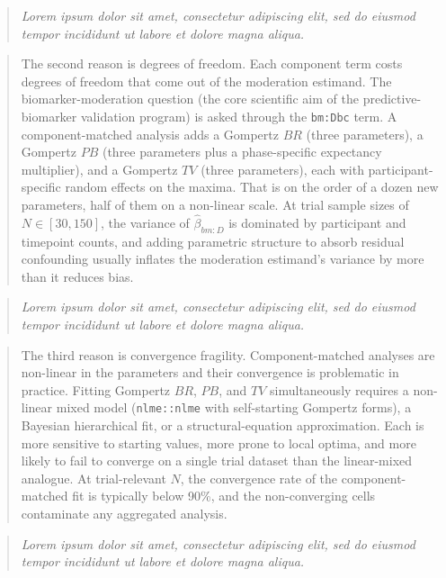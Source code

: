 \documentclass[
  11pt,
]{article}
\newenvironment{rgt}{%
  \begin{quote}\small\itshape\color[RGB]{20,60,160}}{%
  \end{quote}}
\newenvironment{orig}{%
  \begin{quote}\normalsize\color[gray]{0.55}}{%
  \end{quote}}
\begin{document}
\begin{rgt}
Lorem ipsum dolor sit amet, consectetur adipiscing elit, sed do eiusmod tempor incididunt ut labore et dolore magna aliqua.

\end{rgt}

\begin{orig}
The second reason is degrees of freedom. Each component term
costs degrees of freedom that come out of the moderation
estimand. The biomarker-moderation question (the core scientific
aim of the predictive-biomarker validation program) is asked
through the \texttt{bm:Dbc} term. A component-matched analysis
adds a Gompertz \(BR\) (three parameters), a Gompertz \(PB\) (three
parameters plus a phase-specific expectancy multiplier), and a
Gompertz \(TV\) (three parameters), each with
participant-specific random effects on the maxima. That is on
the order of a dozen new parameters, half of them on a
non-linear scale. At trial sample sizes of \(N \in [30, 150]\),
the variance of \(\hat{\beta}_{bm:D}\) is dominated by participant
and timepoint counts, and adding parametric structure to absorb
residual confounding usually inflates the moderation estimand's
variance by more than it reduces bias.

\end{orig}

\begin{rgt}
Lorem ipsum dolor sit amet, consectetur adipiscing elit, sed do eiusmod tempor incididunt ut labore et dolore magna aliqua.

\end{rgt}

\begin{orig}
The third reason is convergence fragility. Component-matched
analyses are non-linear in the parameters and their convergence
is problematic in practice. Fitting Gompertz \(BR\), \(PB\), and
\(TV\) simultaneously requires a non-linear mixed model
(\texttt{nlme::nlme} with self-starting Gompertz forms), a
Bayesian hierarchical fit, or a structural-equation
approximation. Each is more sensitive to starting values, more
prone to local optima, and more likely to fail to converge on a
single trial dataset than the linear-mixed analogue. At
trial-relevant \(N\), the convergence rate of the
component-matched fit is typically below 90\%, and the
non-converging cells contaminate any aggregated analysis.

\end{orig}

\begin{rgt}
Lorem ipsum dolor sit amet, consectetur adipiscing elit, sed do eiusmod tempor incididunt ut labore et dolore magna aliqua.

\end{rgt}
\end{document}
